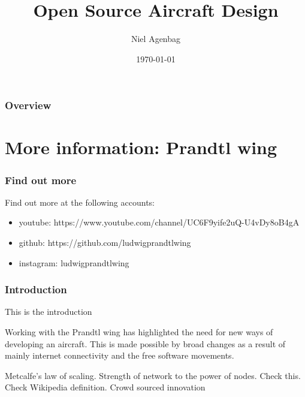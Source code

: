\documentclass{beamer}
\title[Open Aircraft Design]{Open Source Aircraft Design} %
\author{Niel Agenbag} %
\institute[Unaffiliated] %
{
Unaffiliated \\ %
\medskip
\textit{Ludwigprandtlwing@gmail.com or niel.agenbag@gmail.com} %
}
\date{\today} %
\begin{document}
\begin{frame}
\titlepage %
\end{frame}

\begin{frame}
\frametitle{Overview} %
\tableofcontents %
\end{frame}


\section{More information:  Prandtl wing}


\begin{frame}
\frametitle{Find out more}

Find out more at the following accounts:

\begin{itemize}
\item youtube:  https://www.youtube.com/channel/UC6F9yife2uQ-U4vDy8oB4gA
\item github:  https://github.com/ludwigprandtlwing
\item instagram:  ludwigprandtlwing
\end{itemize}
\end{frame}


\begin{frame}
\frametitle{Introduction}

This is the introduction

Working with the Prandtl wing has highlighted the need for new ways of developing an aircraft.
This is made possible by broad changes as a result of mainly internet connectivity and the free software movements.

Metcalfe's law of scaling.  Strength of network to the power of nodes.  Check this.
Check Wikipedia definition.
Crowd sourced innovation


\end{frame}
\end{document}
